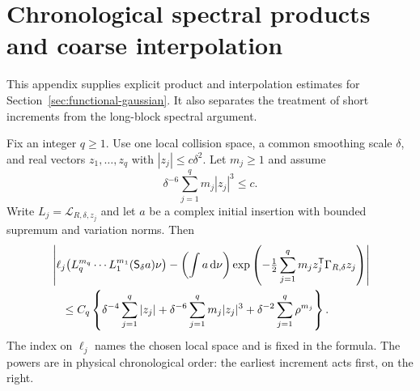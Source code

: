 \section{Chronological spectral products and coarse interpolation}
\label{app:functional-details}
This appendix supplies explicit product and interpolation estimates for
Section~\ref{sec:functional-gaussian}. It also separates the treatment
of short increments from the long-block spectral argument.

\begin{lemma}
\label{lem:chronological-product}
Fix an integer $q\ge1$. Use one local collision space, a common smoothing
scale $\delta$, and real vectors $z_1,\ldots,z_q$ with
$|z_j|\le c\delta^2$. Let $m_j\ge1$ and assume
\[
 \delta^{-6}\sum_{j=1}^q m_j|z_j|^3\le c.
\]
Write $L_j=\mathcal L_{R,\delta,z_j}$ and let $a$ be a complex initial
insertion with bounded supremum and variation norms. Then
\begin{align}
 &\left|\ell_j\bigl(L_q^{m_q}\cdots L_1^{m_1}
                   (\mathsf S_\delta a)\nu\bigr)
       -\left(\int a\,\mathrm d\nu\right)
       \exp\left(-\tfrac12\sum_{j=1}^q
                      m_j z_j^{\mathsf T}\Gamma_{R,\delta}z_j\right)
        \right|\notag\\
 &\quad\le C_q\left\{
       \delta^{-4}\sum_{j=1}^q|z_j|
       +\delta^{-6}\sum_{j=1}^qm_j|z_j|^3
       +\delta^{-2}\sum_{j=1}^q\rho^{m_j}\right\}.
       \label{eq:chronological-product-bound}
\end{align}
The index on $\ell_j$ names the chosen local space and is fixed in the
formula. The powers are in physical chronological order: the earliest
increment acts first, on the right.
\end{lemma}
